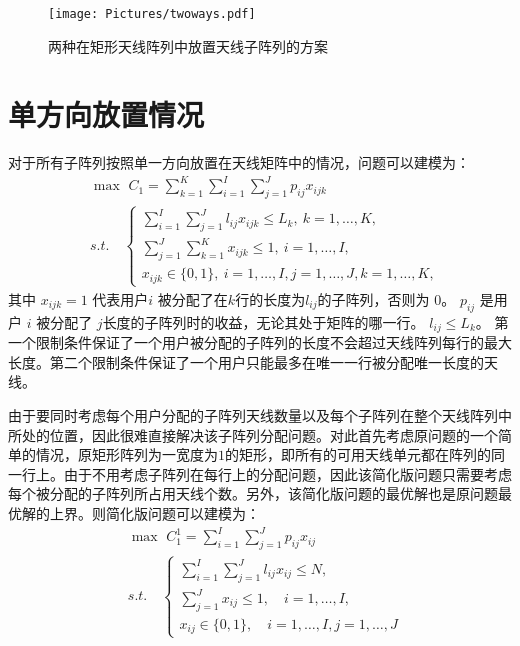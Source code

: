 \begin{figure}[htb]
\centering
\texttt{[image: Pictures/twoways.pdf]}
\caption{两种在矩形天线阵列中放置天线子阵列的方案}
\label{fig:two}
\end{figure}

\section{单方向放置情况}
对于所有子阵列按照单一方向放置在天线矩阵中的情况，问题可以建模为：
\begin{equation}\label{eq:n1}
\begin{split}
&\max \,\, C_1 = \sum\limits_{k=1}^{K}\sum\limits_{i=1}^{I}\sum\limits_{j=1}^J p_{ij} x_{ijk}\\
&s.t.\quad  \left\{
\begin{array}{l}
\sum\limits_{i=1}^{I}\sum\limits_{j=1}^J l_{ij}x_{ijk}\leq L_k, ~ k=1,\dots,K,\\
\sum\limits_{j=1}^{J}\sum\limits_{k=1}^{K} x_{ijk}\leq 1,~ i=1,\dots,I,\\
x_{ijk}\in\{0,1\}, ~ i=1,\dots,I,j=1,\dots,J,
k=1,\dots,K,
\end{array}\right.
\end{split}
\end{equation}
其中 $x_{ijk}=1$ 代表用户$i$ 被分配了在$k$行的长度为$l_{ij}$的子阵列，否则为 $0$。 $p_{ij}$ 是用户 $i$ 被分配了 $j$长度的子阵列时的收益，无论其处于矩阵的哪一行。 $l_{ij} \leq L_k$。 第一个限制条件保证了一个用户被分配的子阵列的长度不会超过天线阵列每行的最大长度。第二个限制条件保证了一个用户只能最多在唯一一行被分配唯一长度的天线。


由于要同时考虑每个用户分配的子阵列天线数量以及每个子阵列在整个天线阵列中所处的位置，因此很难直接解决该子阵列分配问题。对此首先考虑原问题的一个简单的情况，原矩形阵列为一宽度为$1$的矩形，即所有的可用天线单元都在阵列的同一行上。由于不用考虑子阵列在每行上的分配问题，因此该简化版问题只需要考虑每个被分配的子阵列所占用天线个数。另外，该简化版问题的最优解也是原问题最优解的上界。则简化版问题可以建模为：
\begin{equation}
\label{eq:n2}
\begin{split}
&\max \,\, C_1^1 = \sum\limits_{i=1}^{I}\sum\limits_{j=1}^J p_{ij} x_{ij}\\
&s.t.\quad  \left\{\begin{array}{l}
\sum\limits_{i=1}^{I}\sum\limits_{j=1}^J l_{ij}x_{ij}\leq N,\\
\sum\limits_{j=1}^{J} x_{ij}\leq 1,\quad i = 1,\dots,I,\\
x_{ij}\in\{0,1\}, \quad  i=1,\dots,I, j=1,\dots,J \end{array}\right.
\end{split}
\end{equation}

